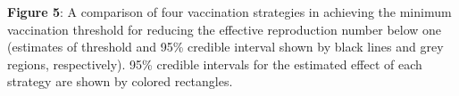 \textbf{Figure 5}: A comparison of four vaccination strategies in achieving the minimum vaccination threshold for reducing the effective reproduction number below one (estimates of threshold and 95\% credible interval shown by black lines and grey regions, respectively). 95\% credible intervals for the estimated effect of each strategy are shown by colored rectangles.